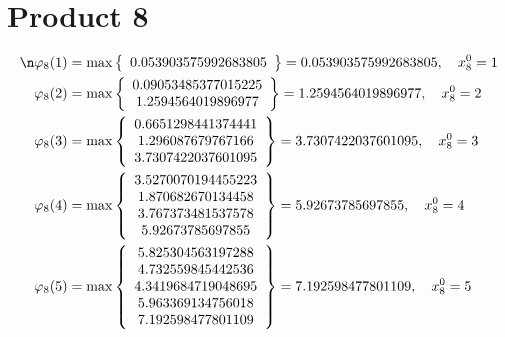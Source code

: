 \documentclass{article}
\begin{document}
\section{Product 8}
\begin{align*}
\n  
  
\varphi_{8}(1) &= \max \left\{ \begin{array}{c}
0.053903575992683805
\end{array} \right\} = 0.053903575992683805, \quad x_{8}^0 = 1\\
  
  
  
  
\varphi_{8}(2) &= \max \left\{ \begin{array}{c}
0.09053485377015225 \\
 1.2594564019896977
\end{array} \right\} = 1.2594564019896977, \quad x_{8}^0 = 2\\
  
  
  
  
\varphi_{8}(3) &= \max \left\{ \begin{array}{c}
0.6651298441374441 \\
 1.296087679767166 \\
 3.7307422037601095
\end{array} \right\} = 3.7307422037601095, \quad x_{8}^0 = 3\\
  
  
  
  
\varphi_{8}(4) &= \max \left\{ \begin{array}{c}
3.5270070194455223 \\
 1.870682670134458 \\
 3.767373481537578 \\
 5.92673785697855
\end{array} \right\} = 5.92673785697855, \quad x_{8}^0 = 4\\
  
  
  
  
\varphi_{8}(5) &= \max \left\{ \begin{array}{c}
5.825304563197288 \\
 4.732559845442536 \\
 4.3419684719048695 \\
 5.963369134756018 \\
 7.192598477801109
\end{array} \right\} = 7.192598477801109, \quad x_{8}^0 = 5\\
  
  
  

\end{align*}
\end{document}
